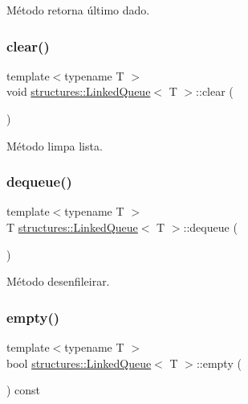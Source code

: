 Método retorna último dado. 

\mbox{\label{classstructures_1_1LinkedQueue_a67dfb58a8feb96abccbd20862767e981}} 
\subsubsection{\texorpdfstring{clear()}{clear()}}
{\footnotesize\ttfamily template$<$typename T $>$ \\
void \mbox{\hyperlink{classstructures_1_1LinkedQueue}{structures\+::\+Linked\+Queue}}$<$ T $>$\+::clear (\begin{DoxyParamCaption}{ }\end{DoxyParamCaption})}



Método limpa lista. 

\mbox{\label{classstructures_1_1LinkedQueue_af6037408a07637554b8a8be7201a756d}} 
\subsubsection{\texorpdfstring{dequeue()}{dequeue()}}
{\footnotesize\ttfamily template$<$typename T $>$ \\
T \mbox{\hyperlink{classstructures_1_1LinkedQueue}{structures\+::\+Linked\+Queue}}$<$ T $>$\+::dequeue (\begin{DoxyParamCaption}{ }\end{DoxyParamCaption})}



Método desenfileirar. 

\mbox{\label{classstructures_1_1LinkedQueue_a24995d6b61ce9e8d05718c966b699c5a}} 
\subsubsection{\texorpdfstring{empty()}{empty()}}
{\footnotesize\ttfamily template$<$typename T $>$ \\
bool \mbox{\hyperlink{classstructures_1_1LinkedQueue}{structures\+::\+Linked\+Queue}}$<$ T $>$\+::empty (\begin{DoxyParamCaption}{ }\end{DoxyParamCaption}) const}




